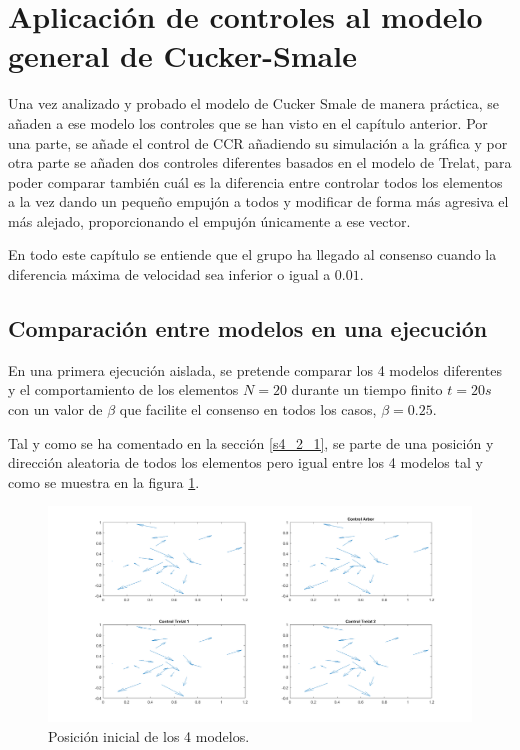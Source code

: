 
\section{Aplicación de controles al modelo general de Cucker-Smale} \label{s4_4}

Una vez analizado y probado el modelo de Cucker Smale de manera práctica, se añaden a ese modelo los controles que se han visto en el capítulo anterior. Por una parte, se añade el control de CCR añadiendo su simulación a la gráfica y por otra parte se añaden dos controles diferentes basados en el modelo de Trelat, para poder comparar también cuál es la diferencia entre controlar todos los elementos a la vez dando un pequeño empujón a todos y modificar de forma más agresiva el más alejado, proporcionando el empujón únicamente a ese vector. 

En todo este capítulo se entiende que el grupo ha llegado al consenso cuando la diferencia máxima de velocidad sea inferior o igual a $0.01$.

\subsection{Comparación entre modelos en una ejecución}
En una primera ejecución aislada, se pretende comparar los 4 modelos diferentes y el comportamiento de los elementos $N=20$ durante un tiempo finito $t=20s$ con un valor de $\beta$ que facilite el consenso en todos los casos, $\beta=0.25$.

Tal y como se ha comentado en la sección \ref{s4_2_1}, se parte de una posición y dirección aleatoria de todos los elementos pero igual entre los 4 modelos tal y como se muestra en la figura \ref{fig:pos_inicial_4models}.

\begin{figure}[!h]
    \centering
    \includegraphics[width=\textwidth]{fig/cap04/3ALLB025/pos_inicial.png}
    \caption{Posición inicial de los 4 modelos.}
    \label{fig:pos_inicial_4models}
\end{figure}


